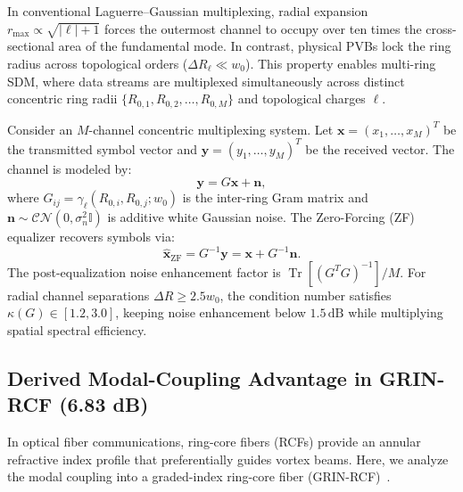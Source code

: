 \documentclass[11pt,a4paper]{article}
\begin{document}
In conventional Laguerre--Gaussian multiplexing, radial expansion $r_{\max} \propto \sqrt{|\ell| + 1}$ forces the outermost channel to occupy over ten times the cross-sectional area of the fundamental mode. In contrast, physical PVBs lock the ring radius across topological orders ($\Delta R_\ell \ll w_0$). This property enables multi-ring SDM, where data streams are multiplexed simultaneously across distinct concentric ring radii $\{R_{0, 1}, R_{0, 2}, \dots, R_{0, M}\}$ and topological charges $\ell$.

Consider an $M$-channel concentric multiplexing system. Let $\mathbf{x} = (x_1, \dots, x_M)^T$ be the transmitted symbol vector and $\mathbf{y} = (y_1, \dots, y_M)^T$ be the received vector. The channel is modeled by:
\begin{equation}
\mathbf{y} = G \mathbf{x} + \mathbf{n},
\label{eq:channel_model}
\end{equation}
where $G_{ij} = \gamma_\ell(R_{0, i}, R_{0, j}; w_0)$ is the inter-ring Gram matrix and $\mathbf{n} \sim \mathcal{CN}(0, \sigma_n^2 \mathbb{I})$ is additive white Gaussian noise. The Zero-Forcing (ZF) equalizer recovers symbols via:
\begin{equation}
\hat{\mathbf{x}}_{\text{ZF}} = G^{-1} \mathbf{y} = \mathbf{x} + G^{-1} \mathbf{n}.
\label{eq:zf_equalizer}
\end{equation}
The post-equalization noise enhancement factor is $\operatorname{Tr}[(G^T G)^{-1}] / M$. For radial channel separations $\Delta R \ge 2.5 w_0$, the condition number satisfies $\kappa(G) \in [1.2, 3.0]$, keeping noise enhancement below $1.5\,\text{dB}$ while multiplying spatial spectral efficiency.

\subsection{Derived Modal-Coupling Advantage in GRIN-RCF (6.83 dB)}
\label{sec:rcf_coupling_683db}

In optical fiber communications, ring-core fibers (RCFs) provide an annular refractive index profile that preferentially guides vortex beams. Here, we analyze the modal coupling into a graded-index ring-core fiber (GRIN-RCF)~\cite{Villalba2023,Brunet2014}.
\end{document}
